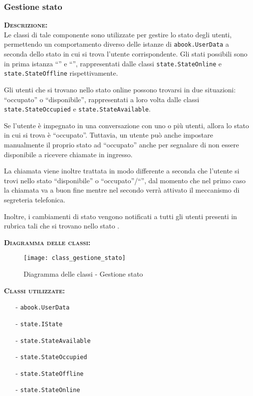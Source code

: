 \subsubsection{Gestione stato}
\begin{description}
	\item{\scshape\bfseries Descrizione:}\\
Le classi di tale componente sono utilizzate per gestire lo stato degli utenti, permettendo un comportamento diverso delle istanze di \texttt{abook.UserData} a seconda dello stato in cui si trova l'utente corrispondente. Gli stati possibili sono in prima istanza ``'' e ``'', rappresentati dalle classi \texttt{state.StateOnline} e \texttt{state.StateOffline} rispettivamente.

Gli utenti che si trovano nello stato online possono trovarsi in due situazioni: ``occupato'' o ``disponibile'', rappresentati a loro volta dalle classi \texttt{state.StateOccupied} e \texttt{state.StateAvailable}.

Se l'utente è impegnato in una conversazione con uno o più utenti, allora lo stato in cui si trova è ``occupato''. Tuttavia, un utente può anche impostare manualmente il proprio stato ad ``occupato'' anche per segnalare di non essere disponibile a ricevere chiamate in ingresso.
	
La chiamata viene inoltre trattata in modo differente a seconda che l'utente si trovi nello stato ``disponibile'' o ``occupato''/``'', dal momento che nel primo caso la chiamata va a buon fine mentre nel secondo verrà attivato il meccanismo di segreteria telefonica.
	
Inoltre, i cambiamenti di stato vengono notificati a tutti gli utenti presenti in rubrica tali che si trovano nello stato .
	\item{\scshape\bfseries Diagramma delle classi:}
\begin{figure}[H]
  \centering
  \texttt{[image: class\_gestione\_stato]}
  \caption{Diagramma delle classi - Gestione stato}\label{fig:gestione_stato}
\end{figure}
	
	\item{\scshape\bfseries Classi utilizzate:}\\ 
	\begin{itemize}[noitemsep,nolistsep]
	  \item[-] \texttt{abook.UserData}
	  \item[-] \texttt{state.IState}
	  \item[-] \texttt{state.StateAvailable}
	  \item[-] \texttt{state.StateOccupied}
	  \item[-] \texttt{state.StateOffline}
	  \item[-] \texttt{state.StateOnline}
	\end{itemize}
\end{description}

